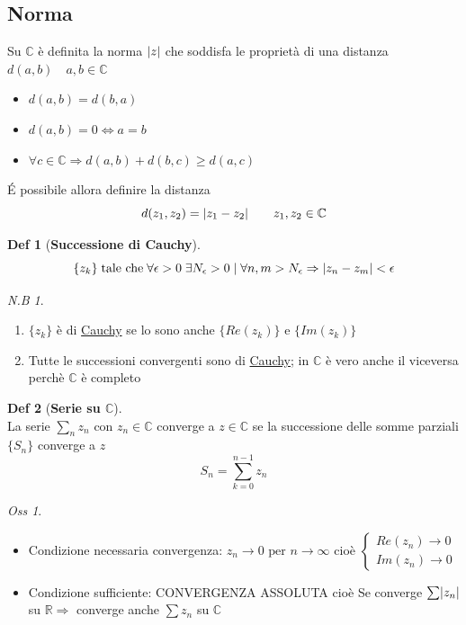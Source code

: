 \documentclass[a4paper,11pt]{report}
\theoremstyle{remark}
\newtheorem*{oss}{Oss}
\newtheorem*{nb}{N.B}
\theoremstyle{definition}
\newtheorem*{Def}{Def}
\newcommand{\C}{\mathbb{C}}
\newcommand{\R}{\mathbb{R}}
\DeclarePairedDelimiter{\abs}{\lvert}{\rvert}
\begin{document}
\subsection*{Norma}
Su $\C$ è definita la norma $\abs{z}$ che soddisfa le proprietà di una distanza $d(a,b) \quad a,b \in \C$
\begin{itemize}
	\item $d(a,b) = d(b,a)$
	\item $d(a,b) = 0 \iff a=b$
	\item $\forall c \in \C \Rightarrow d(a,b) + d(b,c) \geq d(a,c)$
\end{itemize}
\noindent \'E possibile allora definire la distanza 
\[d(z_1,z_2) = \abs{z_1-z_2} \qquad z_1,z_2 \in \C \]
\begin{Def}[\textbf{Successione di Cauchy}]\hfill\\ \label{cauchy}
	\[\{z_k\} \; \text{tale che} \; \forall \epsilon>0 \; \exists N_\epsilon>0 \; | \; \forall n,m>N_\epsilon \Rightarrow \abs{z_n-z_m}<\epsilon\]
\end{Def}
\begin{nb}\hfill
	\begin{enumerate}
		\item $\{z_k\}$ è di \hyperref[cauchy]{Cauchy} se lo sono anche $\{Re(z_k)\} \text{ e } \{Im(z_k)\}$ 
		\item Tutte le successioni convergenti sono di \hyperref[cauchy]{Cauchy}; in $\C$ è vero anche il viceversa perchè $\C$ è completo
	\end{enumerate}
\end{nb}
\begin{Def}[\textbf{Serie su $\C$}]\hfil\\
	La serie $\sum_n z_n$ con $z_n \in \C$ converge a $z \in \C$ se la successione delle somme parziali $\{S_n\}$ converge a $z$
	\[S_n = \sum_{k=0}^{n-1} z_n\]
\end{Def}
\newpage
\begin{oss}\hfil
	\begin{itemize}
		\item Condizione necessaria convergenza: \quad $z_n \to 0 \text{ per } n \to \infty$
		cioè 
		$\begin{cases}
			Re(z_n) \to 0 \\
			Im(z_n) \to 0
		\end{cases}$
		\item Condizione sufficiente: CONVERGENZA ASSOLUTA cioè \newline
		Se converge $\sum \abs{z_n}$  su $\R \Rightarrow$ converge anche $\sum z_n$ su $\C$
	\end{itemize}
\end{oss}
\end{document}
